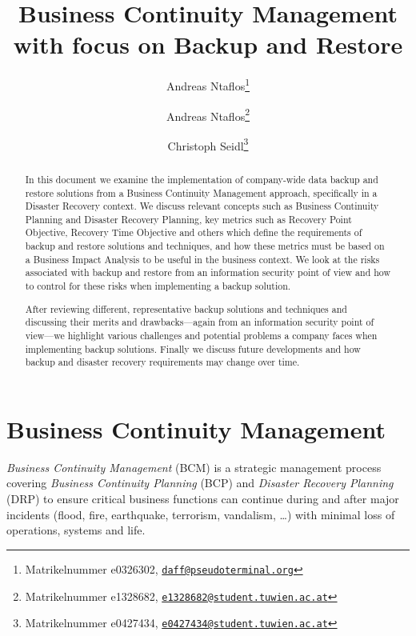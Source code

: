 \documentclass[a4paper,11pt,onecolumn]{scrartcl}
\newcommand{\code}[1]{\small\texttt{#1}\normalsize}
\begin{document}
\title{Business Continuity Management with focus on Backup and Restore}
\publishers{\small{Organizational Aspects of IT Security\\VU 2.0 188.312 2014W}}
\subject{Assignment 1}

\author{Andreas Ntaflos\thanks{Matrikelnummer e0326302, \href{mailto:daff@pseudoterminal.org}{\code{daff@pseudoterminal.org}}}
\and Andreas Ntaflos\thanks{Matrikelnummer e1328682, \href{mailto:e1328682@student.tuwien.ac.at}{\code{e1328682@student.tuwien.ac.at}}}
\and Christoph Seidl\thanks{Matrikelnummer e0427434, \href{mailto:e0427434@student.tuwien.ac.at}{\code{e0427434@student.tuwien.ac.at}}}}

\maketitle

\begin{abstract}
In this document we examine the implementation of company-wide data
backup and restore solutions from a Business Continuity Management
approach, specifically in a Disaster Recovery context. We discuss
relevant concepts such as Business Continuity Planning and Disaster
Recovery Planning, key metrics such as Recovery Point Objective,
Recovery Time Objective and others which define the requirements of
backup and restore solutions and techniques, and how these metrics must
be based on a Business Impact Analysis to be useful in the business
context. We look at the risks associated with backup and restore from an
information security point of view and how to control for these risks
when implementing a backup solution.

After reviewing different, representative backup solutions and
techniques and discussing their merits and drawbacks---again from an
information security point of view---we highlight various challenges and
potential problems a company faces when implementing backup solutions.
Finally we discuss future developments and how backup and disaster
recovery requirements may change over time.
\end{abstract}

\section{Business Continuity Management}

\emph{Business Continuity Management} (BCM) is a strategic management
process covering \emph{Business Continuity Planning} (BCP) and
\emph{Disaster Recovery Planning} (DRP) to ensure critical business
functions can continue during and after major incidents (flood, fire,
earthquake, terrorism, vandalism, \ldots) with minimal
loss of operations, systems and life.
\end{document}
